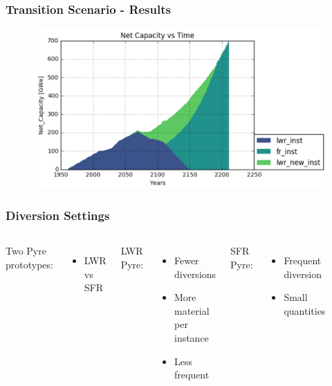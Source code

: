 \begin{frame}
\frametitle{Transition Scenario - Results}
\begin{figure}
	\includegraphics[width=\linewidth]{images/netcap}
\end{figure}
\end{frame}

\begin{frame}
\frametitle{Diversion Settings}
\begin{columns}
	\column[t]{4cm}
	Two Pyre prototypes:
	\begin{itemize}
		\item LWR vs SFR
	\end{itemize}
	LWR Pyre:
	\begin{itemize}
		\item Fewer diversions
		\item More material per instance
		\item Less frequent
	\end{itemize}
	SFR Pyre:
	\begin{itemize}
		\item Frequent diversion
		\item Small quantities
	\end{itemize}
	\column[t]{7cm}
	\begin{figure}
		\includegraphics[width=\linewidth]{images/divertmat}
	\end{figure}
\end{columns}
\end{frame}

